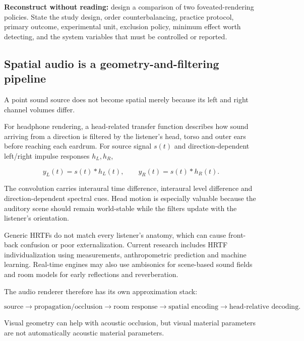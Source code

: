 \textbf{Reconstruct without reading:} design a comparison of two foveated-rendering policies. State the study design, order counterbalancing, practice protocol, primary outcome, experimental unit, exclusion policy, minimum effect worth detecting, and the system variables that must be controlled or reported.

\subsection{Spatial audio is a geometry-and-filtering pipeline}\label{04-visual-computing-ii-ch035-spatial-audio-is-a-geometry-and-filtering-pipeline}

\hypertarget{04-visual-computing-ii-ch035-spatial-audio-is-a-geometry-and-filtering-pipeline}{}

A point sound source does not become spatial merely because its left and right channel volumes differ.

For headphone rendering, a head-related transfer function describes how sound arriving from a direction is filtered by the listener's head, torso and outer ears before reaching each eardrum. For source signal \(s(t)\) and direction-dependent left/right impulse responses \(h_L,h_R\),

\[
y_L(t)=s(t)*h_L(t),\qquad
y_R(t)=s(t)*h_R(t).
\]

The convolution carries interaural time difference, interaural level difference and direction-dependent spectral cues. Head motion is especially valuable because the auditory scene should remain world-stable while the filters update with the listener's orientation.

Generic HRTFs do not match every listener's anatomy, which can cause front-back confusion or poor externalization. Current research includes HRTF individualization using measurements, anthropometric prediction and machine learning. Real-time engines may also use ambisonics for scene-based sound fields and room models for early reflections and reverberation.

The audio renderer therefore has its own approximation stack:

\[
\text{source} \rightarrow
\text{propagation/occlusion} \rightarrow
\text{room response} \rightarrow
\text{spatial encoding} \rightarrow
\text{head-relative decoding}.
\]

Visual geometry can help with acoustic occlusion, but visual material parameters are not automatically acoustic material parameters.

